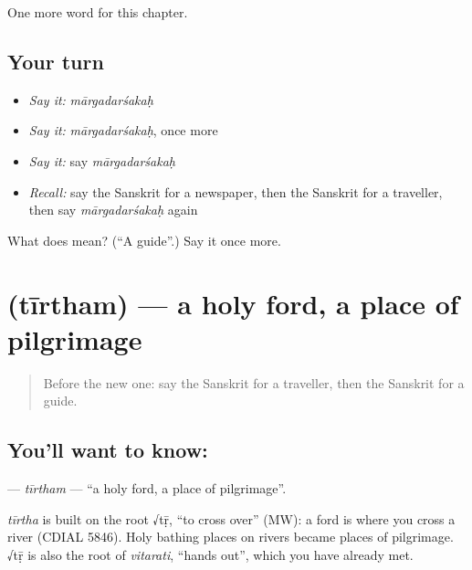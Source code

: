 \begin{grammarlens}[title={What you've built}]
One more word for this chapter.
\end{grammarlens}

\subsection*{Your turn}
\begin{itemize}
\raggedright
  \item \emph{Say it:} \emph{mārgadarśakaḥ}
  \item \emph{Say it:} \emph{mārgadarśakaḥ}, once more
  \item \emph{Say it:} say \emph{mārgadarśakaḥ}
  \item \emph{Recall:} say the Sanskrit for a newspaper, then the Sanskrit for a traveller, then say \emph{mārgadarśakaḥ} again
\end{itemize}

\begin{tcolorbox}[breakable,colback=teal!4,colframe=teal!35!black,title={Before you move on}]
What does  mean? (\textquotedblleft{}A guide\textquotedblright{}.) Say it once more.
\end{tcolorbox}
\section[\texorpdfstring{\sk{तीर्थम्} (tīrtham)}{तीर्थम् (tīrtham)}]{ (tīrtham) — a holy ford, a place of pilgrimage}

\label{lesson:SA-C223-tirtham}



\begin{quote}
Before the new one: say the Sanskrit for a traveller, then the Sanskrit for a guide.
\end{quote}

\subsection*{You'll want to know: }
\textbf{} — \emph{tīrtham} — \textquotedblleft{}a holy ford, a place of pilgrimage\textquotedblright{}.

\begin{cousinweb}
\emph{tīrtha} is built on the root √tṝ, \textquotedblleft{}to cross over\textquotedblright{} (MW): a ford is where you cross a river (CDIAL 5846). Holy bathing places on rivers became places of pilgrimage. √tṝ is also the root of \emph{vitarati}, \textquotedblleft{}hands out\textquotedblright{}, which you have already met.
\end{cousinweb}

